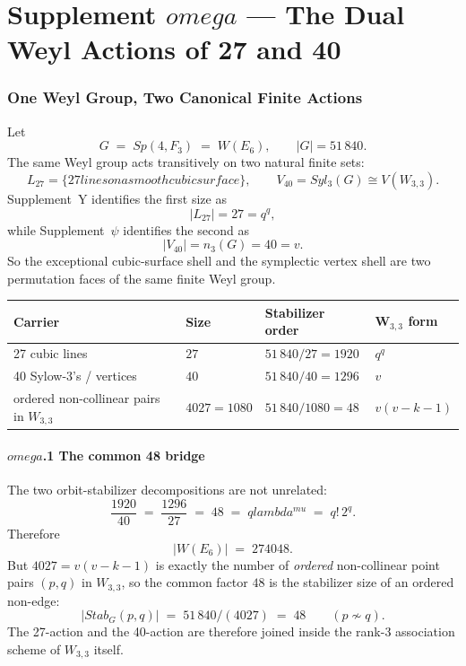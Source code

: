 \documentclass[12pt,a4paper]{article}
\def\mathbb#1{#1}%
\def\mathrm#1{#1}%
\def\mathcal#1{#1}%
\def\text#1{#1}%
\def\omega{omega}%
\def\lambda{lambda}%
\def\mu{mu}%
\def\cdot{ }%
\theoremstyle{definition}
\newcommand{\Sp}{\mathrm{Sp}}
\newcommand{\FF}{\mathbb{F}}
\begin{document}
\clearpage
\part*{\texorpdfstring{Supplement $\omega$ --- The Dual Weyl Actions of 27 and 40}{Supplement omega --- The Dual Weyl Actions of 27 and 40}}

\section*{One Weyl Group, Two Canonical Finite Actions}

Let
\[
G \;=\; \Sp(4,\FF_3) \;=\; W(E_6),
\qquad |G| = 51\,840.
\]
The same Weyl group acts transitively on two natural finite sets:
\[
\mathcal{L}_{27} = \{\text{27 lines on a smooth cubic surface}\},
\qquad
\mathcal{V}_{40} = \mathrm{Syl}_3(G) \cong V(W_{3,3}).
\]
Supplement~Y identifies the first size as
\[
|\mathcal{L}_{27}| = 27 = q^q,
\]
while Supplement~$\psi$ identifies the second as
\[
|\mathcal{V}_{40}| = n_3(G) = 40 = v.
\]
So the exceptional cubic-surface shell and the symplectic vertex shell
are two permutation faces of the same finite Weyl group.

\begin{center}
\renewcommand{\arraystretch}{1.4}
\begin{tabular}{llll}
\toprule
Carrier & Size & Stabilizer order & W$_{3,3}$ form \\
\midrule
27 cubic lines & $27$ & $51\,840/27 = 1920$ & $q^q$ \\
40 Sylow-3's / vertices & $40$ & $51\,840/40 = 1296$ & $v$ \\
ordered non-collinear pairs in $W_{3,3}$ & $40\cdot 27 = 1080$ & $51\,840/1080 = 48$ & $v(v-k-1)$ \\
\bottomrule
\end{tabular}
\end{center}

\subsection*{$\omega$.1 \quad The common 48 bridge}
The two orbit-stabilizer decompositions are not unrelated:
\[
\frac{1920}{40} \;=\; \frac{1296}{27} \;=\; 48
\;=\; q\lambda^{\mu}
\;=\; q!\,2^q.
\]
Therefore
\[
\boxed{\;|W(E_6)| \;=\; 27\cdot 40\cdot 48.\;}
\]
But $40\cdot 27 = v(v-k-1)$ is exactly the number of \emph{ordered}
non-collinear point pairs $(p,q)$ in $W_{3,3}$, so the common factor $48$
is the stabilizer size of an ordered non-edge:
\[
|\mathrm{Stab}_G(p,q)| \;=\; 51\,840 / (40\cdot 27) \;=\; 48
\qquad (p \not\sim q).
\]
The 27-action and the 40-action are therefore joined inside the rank-3
association scheme of $W_{3,3}$ itself.
\end{document}
